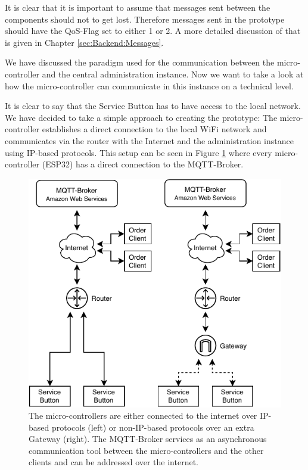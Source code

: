 It is clear that it is important to assume that messages sent between the components should not to get lost. Therefore messages sent in the prototype should have the QoS-Flag set to either 1 or 2. A more detailed discussion of that is given in Chapter \ref{sec:Backend:Messages}.

We have discussed the paradigm used for the communication between the micro-controller and the central administration instance. Now we want to take a look at how the micro-controller can communicate in this instance on a technical level.

It is clear to say that the Service Button has to have access to the local network. We have decided to take a simple approach to creating the prototype: The micro-controller establishes a direct connection to the local WiFi network and communicates via the router with the Internet and the administration instance using IP-based protocols. This setup can be seen in Figure \ref{fig:architecture} where every micro-controller (ESP32) has a direct connection to the MQTT-Broker.

\begin{figure}
    \center
    \includegraphics[width=\linewidth]{figures/architektur.drawio.pdf}
    
    \caption{The micro-controllers are either connected to the internet over IP-based protocols (left) or non-IP-based protocols over an extra Gateway (right). The MQTT-Broker services as an asynchronous communication tool between the micro-controllers and the other clients and can be addressed over the internet.}
    \label{fig:architecture}
\end{figure}

